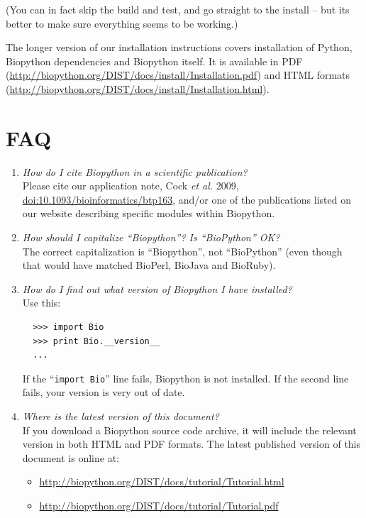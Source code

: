 \documentclass{report}
\begin{document}
\noindent (You can in fact skip the build and test, and go straight to the install --
but its better to make sure everything seems to be working.)

The longer version of our installation instructions covers
installation of Python, Biopython dependencies and Biopython itself.
It is available in PDF
(\url{http://biopython.org/DIST/docs/install/Installation.pdf})
and HTML formats
(\url{http://biopython.org/DIST/docs/install/Installation.html}).

\section{FAQ}

\begin{enumerate}

  \item \emph{How do I cite Biopython in a scientific publication?} \\
  Please cite our application note, Cock \textit{et al.} 2009,
  \href{http://dx.doi.org/10.1093/bioinformatics/btp163}{doi:10.1093/bioinformatics/btp163},
  and/or one of the publications listed on our website describing specific modules within Biopython.

  \item \emph{How should I capitalize ``Biopython''?  Is ``BioPython'' OK?} \\
  The correct capitalization is ``Biopython'', not ``BioPython'' (even though
  that would have matched BioPerl, BioJava and BioRuby).

  \item \emph{How do I find out what version of Biopython I have installed?} \\
  Use this:
  \begin{verbatim}
  >>> import Bio
  >>> print Bio.__version__
  ...
  \end{verbatim}
  If the ``\verb|import Bio|'' line fails, Biopython is not installed.
  If the second line fails, your version is very out of date.

  \item \emph{Where is the latest version of this document?}\\
  If you download a Biopython source code archive, it will include the
  relevant version in both HTML and PDF formats.  The latest published
  version of this document is online at:
  \begin{itemize}
  \item \url{http://biopython.org/DIST/docs/tutorial/Tutorial.html}
  \item \url{http://biopython.org/DIST/docs/tutorial/Tutorial.pdf}
  \end{itemize}
  

\end{enumerate}
\end{document}
